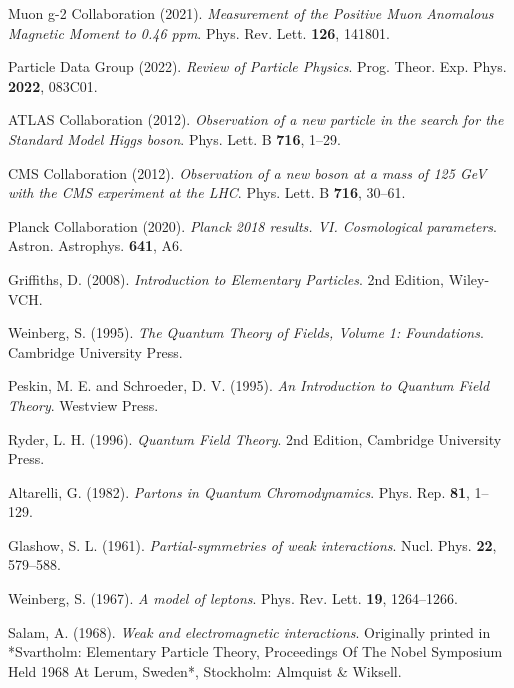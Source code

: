 \documentclass[12pt,a4paper]{article}
\theoremstyle{definition}
\theoremstyle{remark}
\begin{document}
	\begin{thebibliography}{99}
		Muon g-2 Collaboration (2021). \textit{Measurement of the Positive Muon Anomalous Magnetic Moment to 0.46 ppm}. Phys. Rev. Lett. \textbf{126}, 141801.
		
		Particle Data Group (2022). \textit{Review of Particle Physics}. Prog. Theor. Exp. Phys. \textbf{2022}, 083C01.
		
		ATLAS Collaboration (2012). \textit{Observation of a new particle in the search for the Standard Model Higgs boson}. Phys. Lett. B \textbf{716}, 1--29.
		
		CMS Collaboration (2012). \textit{Observation of a new boson at a mass of 125 GeV with the CMS experiment at the LHC}. Phys. Lett. B \textbf{716}, 30--61.
		
		Planck Collaboration (2020). \textit{Planck 2018 results. VI. Cosmological parameters}. Astron. Astrophys. \textbf{641}, A6.
		
		Griffiths, D. (2008). \textit{Introduction to Elementary Particles}. 2nd Edition, Wiley-VCH.
		
		Weinberg, S. (1995). \textit{The Quantum Theory of Fields, Volume 1: Foundations}. Cambridge University Press.
		
		Peskin, M. E. and Schroeder, D. V. (1995). \textit{An Introduction to Quantum Field Theory}. Westview Press.
		
		Ryder, L. H. (1996). \textit{Quantum Field Theory}. 2nd Edition, Cambridge University Press.
		
		Altarelli, G. (1982). \textit{Partons in Quantum Chromodynamics}. Phys. Rep. \textbf{81}, 1--129.
		
		Glashow, S. L. (1961). \textit{Partial-symmetries of weak interactions}. Nucl. Phys. \textbf{22}, 579--588.
		
		Weinberg, S. (1967). \textit{A model of leptons}. Phys. Rev. Lett. \textbf{19}, 1264--1266.
		
		Salam, A. (1968). \textit{Weak and electromagnetic interactions}. Originally printed in *Svartholm: Elementary Particle Theory, Proceedings Of The Nobel Symposium Held 1968 At Lerum, Sweden*, Stockholm: Almquist \& Wiksell.
		

\end{thebibliography}
\end{document}
